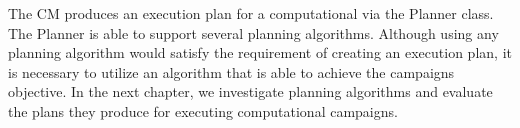 The CM produces an execution plan for a computational via the Planner class. The
Planner is able to support several planning algorithms. Although using any
planning algorithm would satisfy the requirement of creating an execution plan, 
it is necessary to utilize an algorithm that is able to achieve the campaigns 
objective. In the next chapter, we investigate planning algorithms and evaluate 
the plans they produce for executing computational campaigns.
